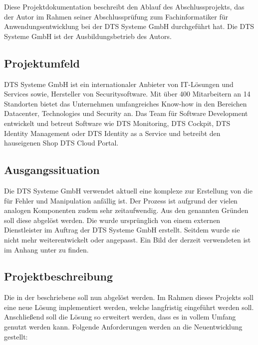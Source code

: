 Diese Projektdokumentation beschreibt den Ablauf des Abschlussprojekts, das der Autor im Rahmen seiner Abschlussprüfung zum Fachinformatiker für Anwendungsentwicklung bei der DTS Systeme GmbH durchgeführt hat. Die DTS Systeme GmbH ist der Ausbildungsbetrieb des Autors.

\subsection{Projektumfeld}
\label{sec:Einführung-Definitionsphase:Projektumfeld}

DTS Systeme GmbH ist ein internationaler Anbieter von IT-Lösungen und Services sowie, Hersteller von Securitysoftware. Mit über 400 Mitarbeitern an 14 Standorten bietet das Unternehmen umfangreiches Know-how in den Bereichen Datacenter, Technologies und Security an.
Das Team für Software Development entwickelt und betreut Software wie DTS Monitoring, DTS Cockpit, DTS Identity Management oder DTS Identity as a Service und betreibt den hauseigenen Shop DTS Cloud Portal.

\subsection{Ausgangssituation}
\label{sec:Einführung-Definitionsphase:Ausgangssituation}

Die DTS Systeme GmbH verwendet aktuell eine komplexe  zur Erstellung von  die für Fehler und Manipulation anfällig ist. Der Prozess ist aufgrund der vielen analogen Komponenten zudem sehr zeitaufwendig. Aus den genannten Gründen soll diese  abgelöst werden.
Die  wurde ursprünglich von einem externen Dienstleister im Auftrag der DTS Systeme GmbH erstellt. Seitdem wurde sie nicht mehr weiterentwickelt oder angepasst.
Ein Bild der derzeit verwendeten  ist im Anhang unter  zu finden.


\subsection{Projektbeschreibung}
\label{sec:Einführung-Definitionsphase:Projektbeschreibung}

Die in der  beschriebene  soll nun abgelöst werden.
Im Rahmen dieses Projekts soll eine neue Lösung implementiert werden, welche langfristig eingeführt werden soll. Anschließend soll die Lösung so erweitert werden, dass es in vollem Umfang genutzt werden kann.
Folgende Anforderungen werden an die Neuentwicklung gestellt:


